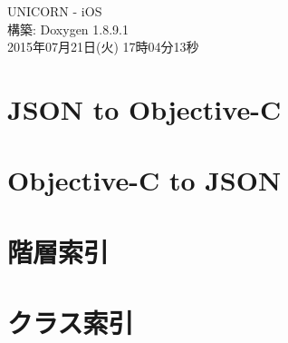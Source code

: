\documentclass[twoside]{book}
\newcommand{\+}{\discretionary{\mbox{\scriptsize$\hookleftarrow$}}{}{}}
\newcommand{\clearemptydoublepage}{%
  \newpage{\pagestyle{empty}\cleardoublepage}%
}
\begin{document}
\hypersetup{pageanchor=false,
             bookmarks=true,
             bookmarksnumbered=true,
             pdfencoding=unicode
            }
\begin{titlepage}
\vspace*{7cm}
\begin{center}%
{\Large U\+N\+I\+C\+O\+R\+N -\/ i\+O\+S }\\
\vspace*{1cm}
{\large 構築\+: Doxygen 1.8.9.1}\\
\vspace*{0.5cm}
{\small 2015年07月21日(火) 17時04分13秒}\\
\end{center}
\end{titlepage}
\clearemptydoublepage
\tableofcontents
\clearemptydoublepage
{}
\hypersetup{pageanchor=true}

\chapter{J\+S\+O\+N to Objective-\/\+C}
\label{json2objc}
\hypertarget{json2objc}{}

\chapter{Objective-\/\+C to J\+S\+O\+N}
\label{objc2json}
\hypertarget{objc2json}{}

\chapter{階層索引}

\chapter{クラス索引}

\end{document}
